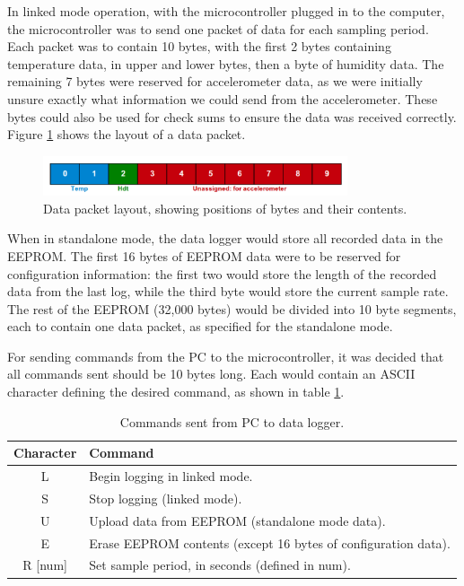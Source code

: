 \documentclass[a4paper,10pt]{article}  %
\begin{document}
In linked mode operation, with the microcontroller plugged in to the
computer, the microcontroller was to send one packet of data for each
sampling period. Each packet was to contain 10 bytes, with the first 2
bytes containing temperature data, in upper and lower bytes, then a
byte of humidity data. The remaining 7 bytes were reserved for
accelerometer data, as we were initially unsure exactly what
information we could send from the accelerometer. These bytes could
also be used for check sums to ensure the data was received
correctly. Figure \ref{fig:datapacket} shows the layout of a data
packet.

\begin{figure}[!htb]
  \begin{center}
    \includegraphics[width=0.8\textwidth]{Packet_diagram.pdf}
  \end{center}
  \caption{Data packet layout, showing positions of bytes and their contents.}
  \label{fig:datapacket}
\end{figure}

When in standalone mode, the data logger would store all recorded data
in the EEPROM. The first 16 bytes of EEPROM data were to be reserved
for configuration information: the first two would store the length of
the recorded data from the last log, while the third byte would store
the current sample rate. The rest of the EEPROM (32,000 bytes) would
be divided into 10 byte segments, each to contain one data packet, as
specified for the standalone mode.

For sending commands from the PC to the microcontroller, it was
decided that all commands sent should be 10 bytes long. Each would
contain an ASCII character defining the desired command, as shown in
table \ref{tab:commands}.

\begin{table}[!htb]
  \begin{center}
    \begin{tabular}{c p{}}
      \textbf{Character} & \textbf{Command} \\
      \hline
      L & Begin logging in linked mode.\\
      S & Stop logging (linked mode).\\
      U & Upload data from EEPROM (standalone mode data).\\
      E & Erase EEPROM contents (except 16 bytes of configuration
      data).\\ 
      R [num] & Set sample period, in seconds (defined in num).
    \end{tabular}
  \end{center}
  \caption{Commands sent from PC to data logger.}
  \label{tab:commands}
\end{table}
\end{document}
